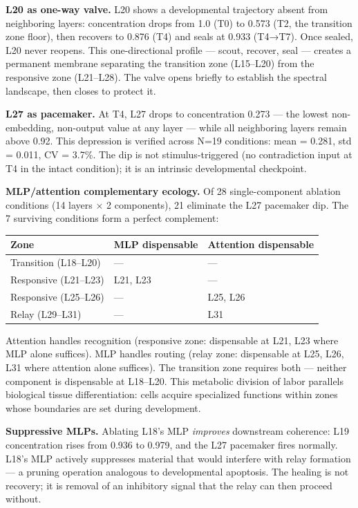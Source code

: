 \documentclass[12pt]{article}
\begin{document}
\textbf{L20 as one-way valve.} L20 shows a developmental trajectory absent from neighboring layers: concentration drops from 1.0 (T0) to 0.573 (T2, the transition zone floor), then recovers to 0.876 (T4) and seals at 0.933 (T4→T7). Once sealed, L20 never reopens. This one-directional profile — scout, recover, seal — creates a permanent membrane separating the transition zone (L15–L20) from the responsive zone (L21–L28). The valve opens briefly to establish the spectral landscape, then closes to protect it.

\textbf{L27 as pacemaker.} At T4, L27 drops to concentration 0.273 — the lowest non-embedding, non-output value at any layer — while all neighboring layers remain above 0.92. This depression is verified across N=19 conditions: mean = 0.281, std = 0.011, CV = 3.7\%. The dip is not stimulus-triggered (no contradiction input at T4 in the intact condition); it is an intrinsic developmental checkpoint.

\textbf{MLP/attention complementary ecology.} Of 28 single-component ablation conditions (14 layers × 2 components), 21 eliminate the L27 pacemaker dip. The 7 surviving conditions form a perfect complement:

\begin{table}[h]
\centering
\small
\begin{tabular}{lll}
\toprule
\textbf{Zone} & \textbf{MLP dispensable} & \textbf{Attention dispensable} \\
\midrule
Transition (L18–L20) & — & — \\
Responsive (L21–L23) & L21, L23 & — \\
Responsive (L25–L26) & — & L25, L26 \\
Relay (L29–L31) & — & L31 \\
\bottomrule
\end{tabular}
\end{table}


Attention handles recognition (responsive zone: dispensable at L21, L23 where MLP alone suffices). MLP handles routing (relay zone: dispensable at L25, L26, L31 where attention alone suffices). The transition zone requires both — neither component is dispensable at L18–L20. This metabolic division of labor parallels biological tissue differentiation: cells acquire specialized functions within zones whose boundaries are set during development.

\textbf{Suppressive MLPs.} Ablating L18's MLP \textit{improves} downstream coherence: L19 concentration rises from 0.936 to 0.979, and the L27 pacemaker fires normally. L18's MLP actively suppresses material that would interfere with relay formation — a pruning operation analogous to developmental apoptosis. The healing is not recovery; it is removal of an inhibitory signal that the relay can then proceed without.
\end{document}
